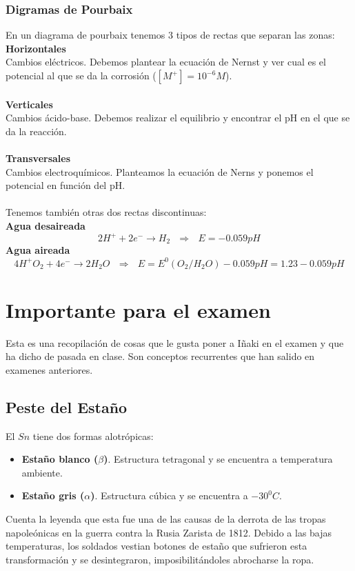\documentclass[12pt]{article}
\begin{document}
	\subsubsection{Digramas de Pourbaix}
	En un diagrama de pourbaix tenemos 3 tipos de rectas que separan las zonas:\\
	\textbf{Horizontales} \\
	Cambios eléctricos. Debemos plantear la ecuación de Nernst y ver cual es el potencial al que se da la corrosión ($[M^+]=10^{-6}M$). \\
	\\
	\textbf{Verticales}\\
	Cambios ácido-base. Debemos realizar el equilibrio y encontrar el pH en el que se da la reacción.\\
	\\
	\textbf{Transversales}\\
	Cambios electroquímicos. Planteamos la ecuación de Nerns y ponemos el potencial en función del pH.\\
	\\
	Tenemos también otras dos rectas discontinuas:\\
	\textbf{Agua desaireada}
	\[2H^+ + 2e^- \longrightarrow H_2 \ \ \ \Rightarrow \ \ \ E=-0.059pH\]	
	\textbf{Agua aireada}
	\[4H^+ O_2 + 4e^- \longrightarrow 2H_2O \ \ \ \Rightarrow \ \ \ E=E^0(O_2/H_2O)-0.059pH = 1.23-0.059pH\]	
	
	
\section{Importante para el examen}
Esta es una recopilación de cosas que le gusta poner a Iñaki en el examen y que ha dicho de pasada en clase. Son conceptos recurrentes que han salido en examenes anteriores.
	\subsection{Peste del Estaño}
	El $Sn$ tiene dos formas alotrópicas:
	\begin{itemize}
		\item \textbf{Estaño blanco ($\beta$)}. Estructura tetragonal y se encuentra a temperatura ambiente.
		\item \textbf{Estaño gris ($\alpha$)}. Estructura cúbica y se encuentra a $-30^0C$.
	\end{itemize}
	Cuenta la leyenda que esta fue una de las causas de la derrota de las tropas napoleónicas en la guerra contra la Rusia Zarista de 1812. Debido a las bajas temperaturas, los soldados vestian botones de estaño que sufrieron esta transformación y se desintegraron, imposibilitándoles  abrocharse la ropa.
	
\end{document}
